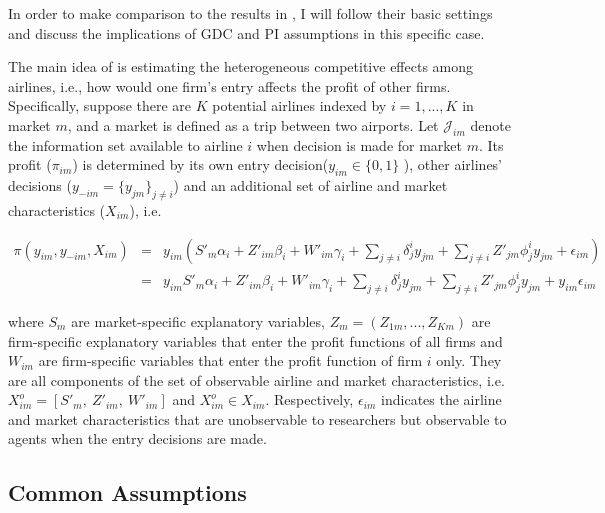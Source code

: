 \documentclass[a4paper]{article}
\begin{document}
In order to make comparison to the results in \cite{ciliberto2009market}, I will follow their basic settings and discuss the implications of GDC and PI assumptions in this specific 
case.

The main idea of \cite{ciliberto2009market} is estimating the heterogeneous competitive effects among airlines, i.e., how would one firm's entry affects the profit of other firms. Specifically, suppose there are $K$ potential airlines indexed by $i=1,...,K$ in market $m$, and a market is defined as a trip between two airports. Let $\mathcal{J}_{im}$ denote the information set available to airline $i$ when decision is made for market $m$. Its profit ($\pi_{im}$) is determined by its own entry decision($y_{im} \in \{0,1\}$ ), other airlines' decisions ($y_{-im}=\{y_{jm}\}_{j \neq i}$) and an additional set of airline and market characteristics ($X_{im}$), i.e. 



\begin{eqnarray}
\pi(y_{im},y_{-im},X_{im})&=& y_{im}(S'_m\alpha_i+Z'_{im}\beta_i+W'_{im}\gamma_i+\sum_{j\neq i}\delta_{j}^i y_{jm}+\sum_{j\neq i}Z'_{jm}\phi_j^iy_{jm}+\epsilon_{im}) \nonumber \\
&=& y_{im}S'_m\alpha_i+Z'_{im}\beta_i+W'_{im}\gamma_i+\sum_{j\neq i}\delta_{j}^i y_{jm}+\sum_{j\neq i}Z'_{jm}\phi_j^iy_{jm} + y_{im} \epsilon_{im}
\label{profit}
\end{eqnarray}

 where $S_m$ are market-specific explanatory variables, $Z_{m}=(Z_{1m},...,Z_{Km})$ are firm-specific explanatory variables that enter the profit functions of all firms and $W_{im}$ are firm-specific variables that enter the profit function of firm $i$ only. They are all components of the set of observable airline and market characteristics, i.e.
$X^o_{im}=[S'_m, \ Z'_{im}, \ W'_{im}]$ and $X^o_{im} \in X_{im}$. Respectively, $\epsilon_{im}$ indicates the airline and market characteristics that are unobservable to researchers but observable to agents when the entry decisions are made. 


 
  \subsection{Common Assumptions}
\end{document}
